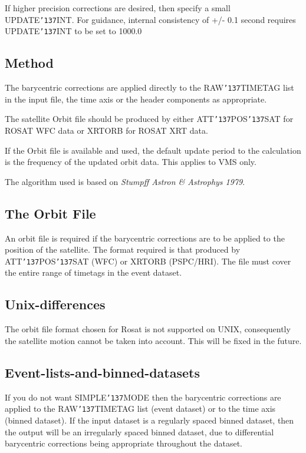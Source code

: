 \documentclass{book}
\renewcommand{\_}{{\tt\char'137}}     %
\begin{document}
If higher precision corrections are desired, then specify a small
UPDATE\_INT. For guidance, internal consistency of +/- 0.1 second
requires UPDATE\_INT to be set to 1000.0

\subsection{Method}
The barycentric corrections are applied directly to the RAW\_TIMETAG
list in the input file, the time axis or the header components as
appropriate.

The satellite Orbit file should be produced by either
ATT\_POS\_SAT for ROSAT WFC data or XRTORB for ROSAT XRT data.

If the Orbit file is available and used, the default update
period to the calculation is the frequency of the updated
orbit data. This applies to VMS only.

The algorithm used is based on {\em Stumpff Astron \& Astrophys 1979}.
\subsection{The Orbit File}
An orbit file is required if the barycentric corrections are to be
applied to the position of the satellite. The format required is
that produced by ATT\_POS\_SAT (WFC) or XRTORB (PSPC/HRI).
The file must cover the entire range of timetags in the event dataset.

\subsection{Unix-differences}
The orbit file format chosen for Rosat is not supported on UNIX,
consequently the satellite motion cannot be taken into account.
This will be fixed in the future.

\subsection{Event-lists-and-binned-datasets}
If you do not want SIMPLE\_MODE then the barycentric corrections are
applied to the RAW\_TIMETAG list (event dataset) or to the time axis
(binned dataset). If the input dataset is a regularly spaced binned
dataset, then the output will be an irregularly spaced binned dataset,
due to differential barycentric corrections being appropriate
throughout the dataset.
\end{document}
